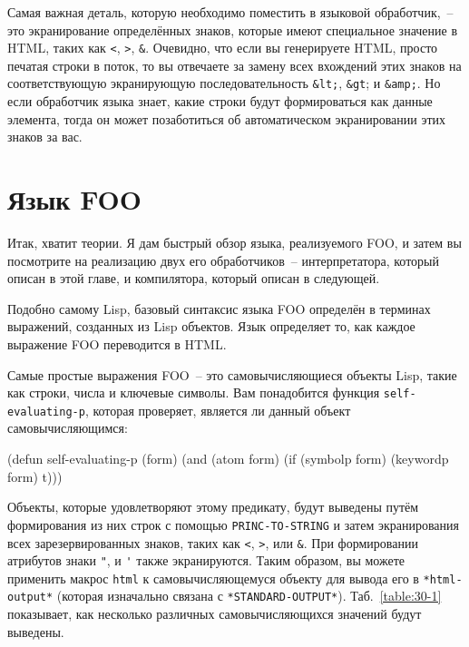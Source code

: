 Самая важная деталь, которую необходимо поместить в языковой обработчик,~-- это
экранирование определённых знаков, которые имеют специальное значение в HTML, таких как
\lstinline{<}, \lstinline{>}, \lstinline!&!. Очевидно, что если вы генерируете HTML, просто печатая
строки в поток, то вы отвечаете за замену всех вхождений этих знаков на соответствующую
экранирующую последовательность \lstinline!&lt;!, \lstinline!&gt!; и \lstinline!&amp;!. Но
если обработчик языка знает, какие строки будут формироваться как данные элемента, тогда
он может позаботиться об автоматическом экранировании этих знаков за вас.

\section{Язык FOO}

Итак, хватит теории. Я дам быстрый обзор языка, реализуемого FOO, и затем вы посмотрите на
реализацию двух его обработчиков~-- интерпретатора, который описан в этой главе, и
компилятора, который описан в следующей.

Подобно самому Lisp, базовый синтаксис языка FOO определён в терминах выражений, созданных
из Lisp объектов. Язык определяет то, как каждое выражение FOO переводится в HTML.

Самые простые выражения FOO~-- это самовычисляющиеся объекты Lisp, такие как строки,
числа и ключевые символы. Вам понадобится функция \lstinline{self-evaluating-p}, которая проверяет,
является ли данный объект самовычисляющимся:

\begin{myverb}
(defun self-evaluating-p (form)
  (and (atom form) (if (symbolp form) (keywordp form) t)))
\end{myverb}

Объекты, которые удовлетворяют этому предикату, будут выведены путём формирования из них
строк с помощью \lstinline{PRINC-TO-STRING} и затем экранирования всех зарезервированных
знаков, таких как \lstinline{<}, \lstinline{>}, или \lstinline!&!. При формировании атрибутов знаки
\lstinline!"!, и \lstinline!'! также экранируются. Таким образом, вы можете применить
макрос \lstinline{html} к самовычисляющемуся объекту для вывода его в
\lstinline{*html-output*} (которая изначально связана с
\lstinline{*STANDARD-OUTPUT*}). Таб.~\ref{table:30-1} показывает, как несколько различных
самовычисляющихся значений будут выведены.

